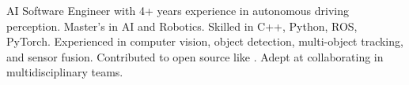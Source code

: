   \item{AI Software Engineer with 4+ years experience in autonomous driving perception. Master's in AI and Robotics. Skilled in C++, Python, ROS, PyTorch. Experienced in computer vision, object detection, multi-object tracking, and sensor fusion. Contributed to open source like . Adept at collaborating in multidisciplinary teams.}
  \resumeSubHeadingListEnd
